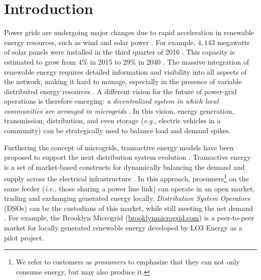 \section{Introduction}


Power grids are undergoing major changes due to rapid acceleration in
renewable energy resources, such as wind and solar power
\cite{5430489}.
For example, $4,\!143$ megawatts of solar panels were installed in the
third quarter of 2016 \cite{seia}. This capacity is estimated to grow
from 4\% in 2015 to 29\% in 2040 \cite{Randal}. 
The massive integration of renewable energy requires detailed
information and visibility into all aspects of the network, making it
hard to manage, especially in the presence of variable distributed
energy resources \cite{7452738}. A different vision for the future of
power-grid operations is therefore emerging: {\em a decentralized
  system in which local communities are arranged in microgrids}
\cite{rahimi2012transactive}. In this vision, energy generation,
transmission, distribution, and even storage (\emph{e.g.}, electric
vehicles in a community) can be strategically used to balance load and
demand spikes.

Furthering the concept of microgrids, transactive energy models have
been proposed to support the next distribution system evolution
\cite{kok2016society,cox2013structured,melton2013gridwise}. Transactive
energy is a set of market-based constructs for dynamically balancing
the demand and supply across the electrical infrastructure
\cite{melton2013gridwise}. In this approach, prosumers\footnote{We
  refer to customers as \emph{prosumers} to emphasize that they can
  not only consume energy, but may also produce it.} on the same
feeder (\emph{i.e.}, those sharing a power line link) can operate in
an open market, trading and exchanging generated energy
locally. \emph{Distribution System Operators} (DSOs) can be the
custodians of this market, while still meeting the net demand
\cite{7462854}. For example, the Brooklyn Microgrid
(\url{brooklynmicrogrid.com}) is a peer-to-peer market for locally
generated renewable energy developed by LO3 Energy as a pilot project.

